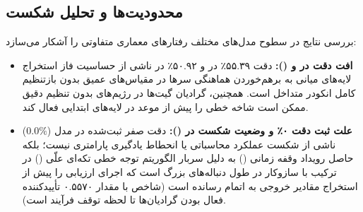 \subsection{محدودیت‌ها و تحلیل شکست}
بررسی نتایج در سطوح مدل‌های مختلف رفتارهای معماری متفاوتی را آشکار می‌سازد:
\begin{itemize}
    \item \textbf{افت دقت در  و  ():} دقت ۵۵.۳۹٪ در  و ۵۰.۹۲٪ در  ناشی از حساسیت فاز استخراج لایه‌های میانی به برهم‌خوردن هماهنگی سرها در مقیاس‌های عمیق بدون بازتنظیم کامل انکودر متداخل است. همچنین، گرادیان گیت‌ها در رژیم‌های بدون تنظیم دقیق ممکن است شاخه خطی را پیش از موعد در لایه‌های ابتدایی فعال کند.
    \item \textbf{علت ثبت دقت ۰٪ و وضعیت شکست در  ():} دقت صفر ثبت‌شده در مدل  ($0.0\%$) ناشی از شکست عملکرد محاسباتی یا انحطاط یادگیری پارامتری نیست؛ بلکه حاصل رویداد وقفه زمانی () به دلیل سربار الگوریتم توجه خطی تکه‌ای علّی () در ترکیب با سازوکار  در طول دنباله‌های بزرگ است که اجرای ارزیابی را پیش از استخراج مقادیر خروجی به اتمام رسانده است (شاخص  با مقدار ۰.۵۵۷۰ تأییدکننده فعال بودن گرادیان‌ها تا لحظه توقف فرآیند است).
\end{itemize}
